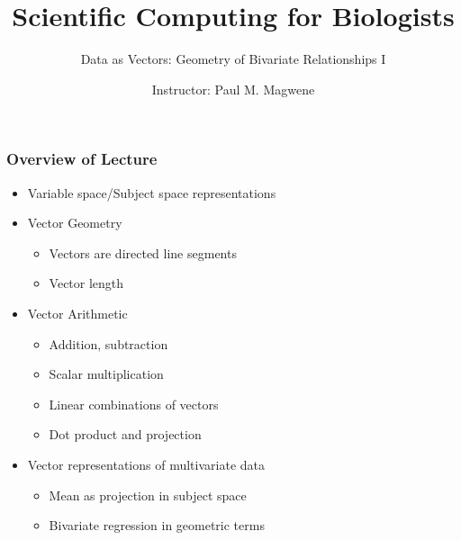 \documentclass{beamer}
\title{Scientific Computing for Biologists}
\subtitle{Data as Vectors: Geometry of Bivariate Relationships I} %
\date{}
\author[P. Magwene]{Instructor: Paul M. Magwene}
\begin{document}
\begin{frame}
\titlepage
\end{frame}

\begin{frame}
  \frametitle{Overview of Lecture}

\begin{itemize}
        \item Variable space/Subject space representations
		\item Vector Geometry
		\begin{itemize}
			\item Vectors are directed line segments
			\item Vector length
		\end{itemize}
		\item Vector Arithmetic
		\begin{itemize}
			\item Addition, subtraction
			\item Scalar multiplication
			\item Linear combinations of vectors
			\item Dot product and projection
		\end{itemize}
		\item Vector representations of multivariate data
        \begin{itemize}
			\item Mean as projection in subject space
			\item Bivariate regression in geometric terms
		\end{itemize}
\end{itemize}

\end{frame}

\end{document}
